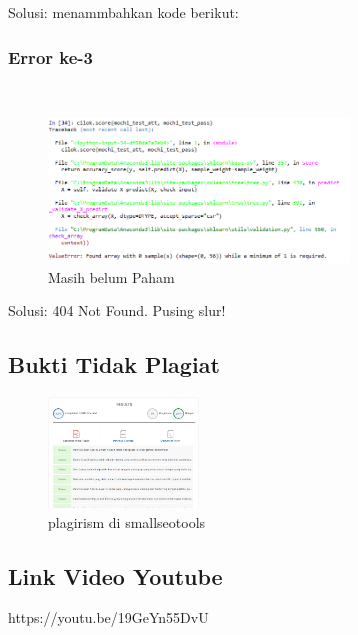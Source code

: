 Solusi:
menammbahkan kode berikut:


\subsubsection{Error ke-3}
\hfill\\
\begin{figure}[H]
    \includegraphics[width=8cm]{figures/1174083/figures2/error4.png}
    \centering
    \caption{Masih belum Paham}
\end{figure}
Solusi:
404 Not Found. Pusing slur!

\subsection{Bukti Tidak Plagiat}
\begin{figure}[H]
	\includegraphics[width=4cm]{figures/1174083/figures2/plagiarism.png}
	\centering
	\caption{plagirism di smallseotools}
\end{figure}

\subsection{Link Video Youtube}
https://youtu.be/19GeYn55DvU
